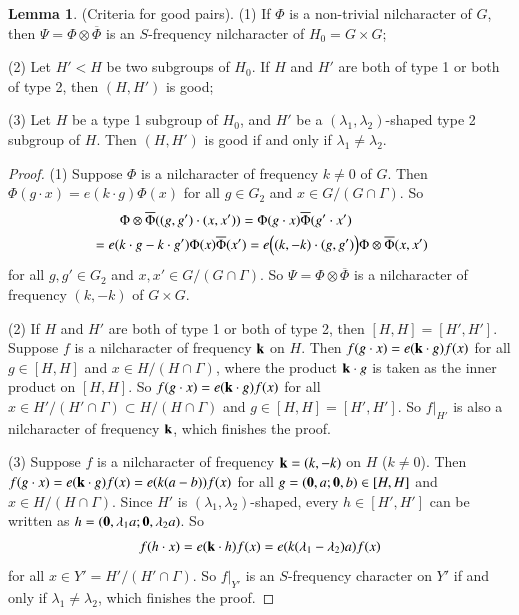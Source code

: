 \documentclass[12pt,amstex]{amsart}
\theoremstyle{definition}
\newtheorem{lem}[thm]{Lemma}
\begin{document}
\begin{lem}\label{good}(Criteria for good pairs).
(1) If $\Phi$ is a non-trivial nilcharacter of $G$, then $\Psi=\Phi\otimes\overline{\Phi}$ is an $S$-frequency nilcharacter of $H_{0}=G\times G$;

(2) Let $H'<H$ be two subgroups of $H_{0}$. If $H$ and $H'$ are both of type 1 or both of type 2, then $(H,H')$ is good;

(3) Let $H$ be a type 1 subgroup of $H_{0}$, and $H'$ be a $(\lambda_{1},\lambda_{2})$-shaped type 2 subgroup of $H$. Then $(H,H')$ is good if and only if $\lambda_{1}\neq\lambda_{2}$.
\end{lem}
\begin{proof}(1) Suppose $\Phi$ is a nilcharacter of frequency $k\neq 0$ of $G$. Then $\Phi(g\cdot x)=e(k\cdot g)\Phi(x)$ for all $g\in G_{2}$ and $x\in G/(G\cap\Gamma)$. So
  \begin{equation}\nonumber
    \begin{split}
      &\qquad\Phi\otimes\overline{\Phi}((g,g')\cdot (x,x'))=\Phi(g\cdot x)\overline{\Phi}(g'\cdot x')
      \\&=e(k\cdot g-k\cdot g')\Phi(x)\overline{\Phi}(x')
=e\Bigl((k,-k)\cdot(g,g')\Bigr)\Phi\otimes\overline{\Phi}(x,x')
    \end{split}
  \end{equation}
for all $g,g'\in G_{2}$ and $x,x'\in G/(G\cap\Gamma)$. So $\Psi=\Phi\otimes\overline{\Phi}$ is a nilcharacter of frequency $(k,-k)$ of $G\times G$.


  (2) If $H$ and $H'$ are both of type 1 or both of type 2, then $[H,H]=[H',H']$. Suppose $f$ is a nilcharacter of frequency $\bold{k}$ on $H$. Then $f(g\cdot x)=e(\bold{k}\cdot g)f(x)$ for all $g\in[H,H]$ and $x\in H/(H\cap\Gamma)$, where the product $\bold{k}\cdot g$ is taken as the inner product on $[H,H]$. So $f(g\cdot x)=e(\bold{k}\cdot g)f(x)$ for all $x\in H'/(H'\cap\Gamma)\subset H/(H\cap\Gamma)$ and $g\in [H,H]=[H',H']$. So $f|_{H'}$ is also a nilcharacter of frequency $\bold{k}$, which finishes the proof.

  (3) Suppose $f$ is a nilcharacter of frequency $\bold{k}=(k,-k)$ on $H$ ($k\neq 0$). Then $f(g\cdot x)=e(\bold{k}\cdot g)f(x)=e(k(a-b))f(x)$ for all $g=(\bold{0},a;\bold{0},b)\in[H,H]$ and  $x\in H/(H\cap\Gamma)$. Since $H'$ is $(\lambda_{1},\lambda_{2})$-shaped, every $h\in [H',H']$ can be written as $h=(\bold{0},\lambda_{1} a;\bold{0},\lambda_{2}a)$. So
    \begin{equation}\nonumber
    \begin{split}
   f(h\cdot x)=e(\bold{k}\cdot h)f(x)=e(k(\lambda_{1}-\lambda_{2})a)f(x)
    \end{split}
  \end{equation}
  for all $x\in Y'=H'/(H'\cap\Gamma)$. So $f|_{Y'}$ is an $S$-frequency character on $Y'$ if and only if $\lambda_{1}\neq\lambda_{2}$, which finishes the proof.
\end{proof}
\end{document}

